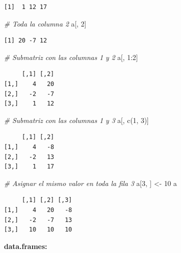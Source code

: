 \documentclass[
]{book}
\newenvironment{Shaded}{\begin{snugshade}}{\end{snugshade}}
\newcommand{\CommentTok}[1]{\textcolor[rgb]{0.56,0.35,0.01}{\textit{#1}}}
\newcommand{\DecValTok}[1]{\textcolor[rgb]{0.00,0.00,0.81}{#1}}
\newcommand{\FunctionTok}[1]{\textcolor[rgb]{0.00,0.00,0.00}{#1}}
\newcommand{\NormalTok}[1]{#1}
\newcommand{\OtherTok}[1]{\textcolor[rgb]{0.56,0.35,0.01}{#1}}
\newcommand{\SpecialCharTok}[1]{\textcolor[rgb]{0.00,0.00,0.00}{#1}}
\begin{document}
\begin{verbatim}
[1]  1 12 17
\end{verbatim}

\begin{Shaded}
\begin{Highlighting}[]
\CommentTok{\# Toda la columna 2}
\NormalTok{a[, }\DecValTok{2}\NormalTok{]}
\end{Highlighting}
\end{Shaded}

\begin{verbatim}
[1] 20 -7 12
\end{verbatim}

\begin{Shaded}
\begin{Highlighting}[]
\CommentTok{\# Submatriz con las columnas 1 y 2}
\NormalTok{a[, }\DecValTok{1}\SpecialCharTok{:}\DecValTok{2}\NormalTok{]}
\end{Highlighting}
\end{Shaded}

\begin{verbatim}
     [,1] [,2]
[1,]    4   20
[2,]   -2   -7
[3,]    1   12
\end{verbatim}

\begin{Shaded}
\begin{Highlighting}[]
\CommentTok{\# Submatriz con las columnas 1 y 3}
\NormalTok{a[, }\FunctionTok{c}\NormalTok{(}\DecValTok{1}\NormalTok{, }\DecValTok{3}\NormalTok{)]}
\end{Highlighting}
\end{Shaded}

\begin{verbatim}
     [,1] [,2]
[1,]    4   -8
[2,]   -2   13
[3,]    1   17
\end{verbatim}

\begin{Shaded}
\begin{Highlighting}[]
\CommentTok{\# Asignar el mismo valor en toda la fila 3}
\NormalTok{a[}\DecValTok{3}\NormalTok{, ] }\OtherTok{\textless{}{-}} \DecValTok{10}
\NormalTok{a}
\end{Highlighting}
\end{Shaded}

\begin{verbatim}
     [,1] [,2] [,3]
[1,]    4   20   -8
[2,]   -2   -7   13
[3,]   10   10   10
\end{verbatim}

\textbf{data.frames:}
\end{document}
